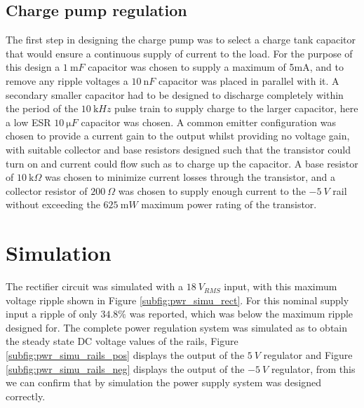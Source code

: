 \subsection{Charge pump regulation}
The first step in designing the charge pump was to select a charge tank capacitor that would ensure a continuous supply of current to the load. For the purpose of this design a $\SI{1}{\milli F}$ capacitor was chosen to supply a maximum of 5mA, and to remove any ripple voltages a $\SI{10}{\nano F}$ capacitor was placed in parallel with it. A secondary smaller capacitor had to be designed to discharge completely within the period of the $\SI{10}{\kilo Hz}$ pulse train to supply charge to the larger capacitor, here a low ESR $\SI{10}{\micro F}$ capacitor was chosen.\vspace{4mm} \newline
A common emitter configuration was chosen to provide a current gain to the output whilst providing no voltage gain, with suitable collector and base resistors designed such that the transistor could turn on and current could flow such as to charge up the capacitor. A base resistor of $\SI{10}{\kilo \Omega}$ was chosen to minimize current losses through the transistor, and a collector resistor of $\SI{200}{\Omega}$ was chosen to supply enough current to the $\SI{-5}{V}$ rail without exceeding the $\SI{625}{\milli W}$ maximum power rating of the transistor.

\section{Simulation} \label{sec:pwr_simu}
The rectifier circuit was simulated with a $\SI{18}{V_{RMS}}$ input, with this maximum voltage ripple shown in Figure \ref{subfig:pwr_simu_rect}. For this nominal supply input a ripple of only $34.8\%$ was reported, which was below the maximum ripple designed for. The complete power regulation system was simulated as to obtain the steady state DC voltage values of the rails, Figure \ref{subfig:pwr_simu_rails_pos} displays the output of the $\SI{5}{V}$ regulator and Figure \ref{subfig:pwr_simu_rails_neg} displays the output of the $\SI{-5}{V}$ regulator, from this we can confirm that by simulation the power supply system was designed correctly.

